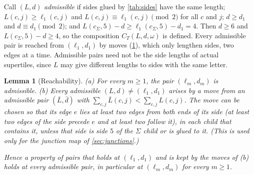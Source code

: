 \documentclass[11pt]{amsart}
\newtheorem{lemma}[theorem]{Lemma}
\theoremstyle{definition}
\theoremstyle{remark}
\begin{document}
Call $(L,d)$ \emph{admissible} if sides glued by \cref{tab:sides} have the same
length; $L(c,j)\ge\ell_1(c,j)$ and $L(c,j)\equiv\ell_1(c,j)\pmod2$ for all $c$ and $j$; $d\ge d_1$ and $d\equiv
d_1\pmod2$; and $L(c_\Sigma,5)-d\ge\ell_1(c_\Sigma,5)-d_1=4$. Then $d\ge6$ and $L(c_\Sigma,5)-d\ge4$, so the composition
$C_T(L,d,\omega)$ is defined. Every admissible pair is reached from $(\ell_1,d_1)$ by moves (\cref{lem:reach}), which
only lengthen sides, two edges at a time. Admissible pairs need not be the side lengths of actual supertiles, since $L$
may give different lengths to sides with the same letter.

\begin{lemma}[Reachability]\label{lem:reach}
\textup{(a)} For every $m\ge1$, the pair $(\ell_m,d_m)$ is admissible. \textup{(b)} Every admissible
$(L,d)\neq(\ell_1,d_1)$ arises by a move from an admissible pair $(\bar L,\bar d)$ with
$\sum_{c,j}\bar L(c,j)<\sum_{c,j}L(c,j)$. The move can be chosen so that its edge $e$ lies at least two edges from both
ends of its side (at least two edges of the side precede $e$ and at least two follow it), in each child that contains
it, unless that side is side $5$ of the $\Sigma$ child or is glued to it. (This is used only for the junction map of
\cref{sec:junctions}.)

Hence a property of pairs that holds at $(\ell_1,d_1)$ and is kept by the moves of \textup{(b)} holds at every
admissible pair, in particular at $(\ell_m,d_m)$ for every $m\ge1$.
\end{lemma}
\end{document}

